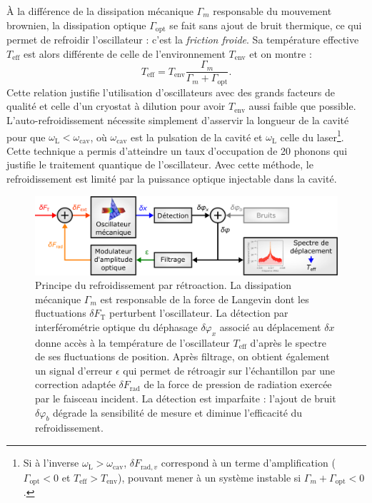 \documentclass[12pt,a4paper]{article}
\begin{document}
À la différence de la dissipation mécanique $\Gamma_m$ responsable du mouvement brownien, la dissipation optique $\Gamma_\mathrm{opt}$ se fait sans ajout de bruit thermique, ce qui permet de refroidir l'oscillateur : c'est la \textit{friction froide}.
Sa température effective $T_\mathrm{eff}$ est alors différente de celle de l'environnement $T_\mathrm{env}$ et on montre :
\begin{equation}
T_\mathrm{eff} = T_\mathrm{env} \frac{\Gamma_m}{\Gamma_m+\Gamma_\mathrm{opt}}.
\end{equation}
Cette relation justifie l'utilisation d'oscillateurs avec des grands facteurs de qualité et celle d'un cryostat à dilution pour avoir $T_\mathrm{env}$ aussi faible que possible.
L'auto-refroidissement nécessite \og simplement \fg{} d'asservir la longueur de la cavité pour que $\omega_\mathrm{L} < \omega_\mathrm{cav}$, où $\omega_\mathrm{cav}$ est la pulsation de la cavité et $\omega_\mathrm{L}$ celle du laser\footnote{Si à l'inverse $\omega_\mathrm{L} > \omega_\mathrm{cav}$, $\delta F_{\mathrm{rad}, v}$ correspond à un terme d'amplification ($\Gamma_\mathrm{opt} < 0 $ et $T_\mathrm{eff} > T_\mathrm{env}$), pouvant mener à un système instable si $\Gamma_m + \Gamma_\mathrm{opt} < 0$.}.
Cette technique a permis d'atteindre un taux d'occupation de 20 phonons qui justifie le traitement quantique de l'oscillateur.
Avec cette méthode, le refroidissement est limité par la puissance optique injectable dans la cavité.

\begin{figure}
\center
\includegraphics[scale=0.6]{figures/feedback_cooling_v2.png}
\caption{Principe du refroidissement par rétroaction.
La dissipation mécanique $\Gamma_m$ est responsable de la force de Langevin dont les fluctuations $\delta F_\mathrm{T}$ perturbent l'oscillateur.
La détection par interférométrie optique du déphasage $\delta \varphi_x$ associé au déplacement $\delta x$ donne accès à la température de l'oscillateur $T_\mathrm{eff}$ d'après le spectre de ses fluctuations de position.
Après filtrage, on obtient également un signal d'erreur $\epsilon$ qui permet de rétroagir sur l'échantillon par une correction adaptée $\delta F_\mathrm{rad}$ de la force de pression de radiation exercée par le faisceau incident.
La détection est imparfaite : l'ajout de bruit $\delta \varphi_b$ dégrade la sensibilité de mesure et diminue l'efficacité du refroidissement.}
\label{fig:feedback_scheme}
\end{figure}
\end{document}
